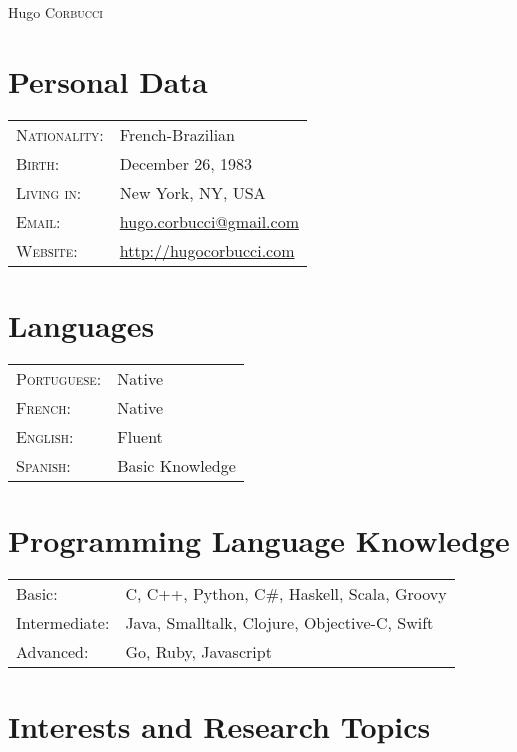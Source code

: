 \documentclass[letter,10pt]{article}
\begin{document}
\par{\centering
		{\Huge Hugo \textsc{Corbucci}
	}\bigskip\par}

      \section{Personal Data}

\begin{tabular}{p{2.5cm}l}
  \textsc{Nationality:} & French-Brazilian
  \\
  \textsc{Birth:} & December 26, 1983 \\
  \textsc{Living in:}   & New York, NY, USA \\
  \textsc{Email:}     &
  \href{mailto:hugo.corbucci@gmail.com}{hugo.corbucci@gmail.com}\\
  \textsc{Website:}     & \href{http://hugocorbucci.com}{http://hugocorbucci.com}
\end{tabular}

\section{Languages}
\begin{tabular}{p{2.5cm}l}
 \textsc{Portuguese:}&Native\\
 \textsc{French:}&Native\\
 \textsc{English:}&Fluent\\
 \textsc{Spanish:}&Basic Knowledge\\
\end{tabular}

\section{Programming Language Knowledge}
\begin{tabular}{p{2.5cm}l}
 Basic:& C, C++, Python, C\#, Haskell, Scala, Groovy\\
 Intermediate:& Java, Smalltalk, Clojure, Objective-C, Swift\\
 Advanced:& Go, Ruby, Javascript\\
\end{tabular}

\section{Interests and Research Topics}
\end{document}
